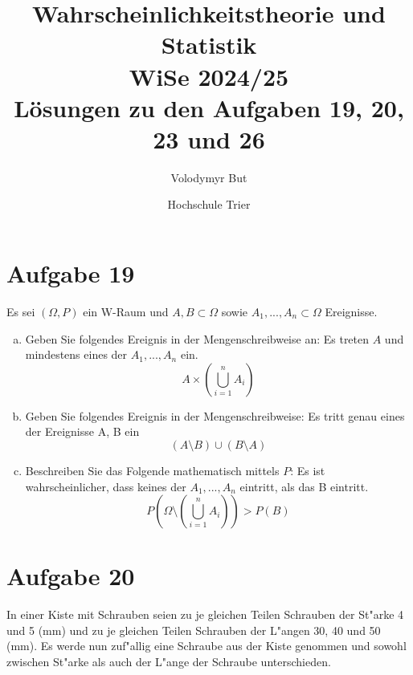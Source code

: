 \documentclass[10pt, oneside]{article}
\title{Wahrscheinlichkeitstheorie und Statistik\\[5pt]\Large WiSe 2024/25\\[15pt]\Large L{\"o}sungen zu den Aufgaben 19, 20, 23 und 26}
\author{Volodymyr But}
\date{Hochschule Trier}
\begin{document}
\sloppy

\maketitle
\vspace{25pt}

\section{Aufgabe 19}

Es sei $(\Omega, P)$ ein W-Raum und $A, B \subset \Omega$ sowie $A_1,...,A_n
\subset \Omega$ Ereignisse.

\begin{enumerate}[(a)]
    \item Geben Sie folgendes Ereignis in der Mengenschreibweise an: Es treten
        $A$ und mindestens eines der $A_1,...,A_n$ ein.
        \begin{equation*}
            A \times \left(\bigcup_{i = 1}^nA_i\right)
        \end{equation*}
    \item Geben Sie folgendes Ereignis in der Mengenschreibweise: Es tritt genau
        eines der Ereignisse A, B ein
        \begin{equation*}
            (A \setminus B) \cup (B \setminus A)
        \end{equation*}
    \item Beschreiben Sie das Folgende mathematisch mittels $P$: Es ist
        wahrscheinlicher, dass keines der $A_1,...,A_n$ eintritt, als das B
        eintritt.
        \begin{equation*}
            P\left(\Omega \setminus \left(\bigcup_{i = 1}^nA_i\right)\right) > P(B)
        \end{equation*}
\end{enumerate}

\section{Aufgabe 20}

In einer Kiste mit Schrauben seien zu je gleichen Teilen Schrauben der St"arke
4 und 5 (mm) und zu je gleichen Teilen Schrauben der L"angen 30, 40 und 50
(mm). Es werde nun zuf"allig eine Schraube aus der Kiste genommen und sowohl
zwischen St"arke als auch der L"ange der Schraube unterschieden.
\end{document}
